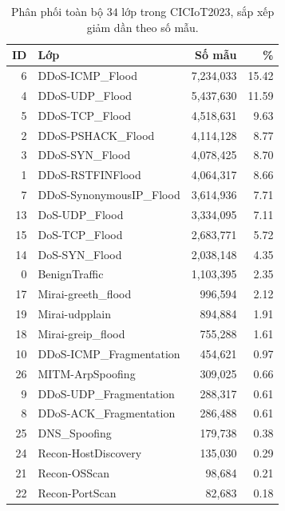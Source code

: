 \begin{table}[H]
    \centering
    \caption{Phân phối toàn bộ $34$ lớp trong CICIoT2023, sắp xếp giảm dần theo số mẫu.}
    \label{tab:cic23_dist}
    \small
    \begin{tabular}{rlrr}
        \hline
        ID & Lớp & Số mẫu & \% \\
        \hline
        6  & DDoS-ICMP\_Flood          & 7{,}234{,}033 & 15.42 \\
        4  & DDoS-UDP\_Flood           & 5{,}437{,}630 & 11.59 \\
        5  & DDoS-TCP\_Flood           & 4{,}518{,}631 & 9.63 \\
        2  & DDoS-PSHACK\_Flood        & 4{,}114{,}128 & 8.77 \\
        3  & DDoS-SYN\_Flood           & 4{,}078{,}425 & 8.70 \\
        1  & DDoS-RSTFINFlood          & 4{,}064{,}317 & 8.66 \\
        7  & DDoS-SynonymousIP\_Flood  & 3{,}614{,}936 & 7.71 \\
        13 & DoS-UDP\_Flood            & 3{,}334{,}095 & 7.11 \\
        15 & DoS-TCP\_Flood            & 2{,}683{,}771 & 5.72 \\
        14 & DoS-SYN\_Flood            & 2{,}038{,}148 & 4.35 \\
        0  & BenignTraffic             & 1{,}103{,}395 & 2.35 \\
        17 & Mirai-greeth\_flood       & 996{,}594     & 2.12 \\
        19 & Mirai-udpplain            & 894{,}884     & 1.91 \\
        18 & Mirai-greip\_flood        & 755{,}288     & 1.61 \\
        10 & DDoS-ICMP\_Fragmentation  & 454{,}621     & 0.97 \\
        26 & MITM-ArpSpoofing          & 309{,}025     & 0.66 \\
        9  & DDoS-UDP\_Fragmentation   & 288{,}317     & 0.61 \\
        8  & DDoS-ACK\_Fragmentation   & 286{,}488     & 0.61 \\
        25 & DNS\_Spoofing             & 179{,}738     & 0.38 \\
        24 & Recon-HostDiscovery       & 135{,}030     & 0.29 \\
        21 & Recon-OSScan              & 98{,}684      & 0.21 \\
        22 & Recon-PortScan            & 82{,}683      & 0.18 \\

\end{tabular}
\end{table}
